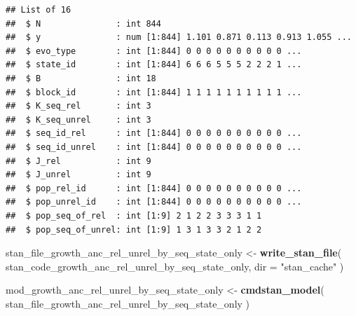 \documentclass[
]{article}
\newenvironment{Shaded}{\begin{snugshade}}{\end{snugshade}}
\newcommand{\AttributeTok}[1]{\textcolor[rgb]{0.13,0.29,0.53}{#1}}
\newcommand{\DecValTok}[1]{\textcolor[rgb]{0.00,0.00,0.81}{#1}}
\newcommand{\FunctionTok}[1]{\textcolor[rgb]{0.13,0.29,0.53}{\textbf{#1}}}
\newcommand{\NormalTok}[1]{#1}
\newcommand{\OtherTok}[1]{\textcolor[rgb]{0.56,0.35,0.01}{#1}}
\newcommand{\SpecialCharTok}[1]{\textcolor[rgb]{0.81,0.36,0.00}{\textbf{#1}}}
\newcommand{\StringTok}[1]{\textcolor[rgb]{0.31,0.60,0.02}{#1}}
\begin{document}
\begin{verbatim}
## List of 16
##  $ N               : int 844
##  $ y               : num [1:844] 1.101 0.871 0.113 0.913 1.055 ...
##  $ evo_type        : int [1:844] 0 0 0 0 0 0 0 0 0 0 ...
##  $ state_id        : int [1:844] 6 6 6 5 5 5 2 2 2 1 ...
##  $ B               : int 18
##  $ block_id        : int [1:844] 1 1 1 1 1 1 1 1 1 1 ...
##  $ K_seq_rel       : int 3
##  $ K_seq_unrel     : int 3
##  $ seq_id_rel      : int [1:844] 0 0 0 0 0 0 0 0 0 0 ...
##  $ seq_id_unrel    : int [1:844] 0 0 0 0 0 0 0 0 0 0 ...
##  $ J_rel           : int 9
##  $ J_unrel         : int 9
##  $ pop_rel_id      : int [1:844] 0 0 0 0 0 0 0 0 0 0 ...
##  $ pop_unrel_id    : int [1:844] 0 0 0 0 0 0 0 0 0 0 ...
##  $ pop_seq_of_rel  : int [1:9] 2 1 2 2 3 3 3 1 1
##  $ pop_seq_of_unrel: int [1:9] 1 3 1 3 3 2 1 2 2
\end{verbatim}

\begin{Shaded}
\begin{Highlighting}[]
\NormalTok{stan\_file\_growth\_anc\_rel\_unrel\_by\_seq\_state\_only }\OtherTok{\textless{}{-}} \FunctionTok{write\_stan\_file}\NormalTok{(}
\NormalTok{  stan\_code\_growth\_anc\_rel\_unrel\_by\_seq\_state\_only,}
  \AttributeTok{dir =} \StringTok{"stan\_cache"}
\NormalTok{)}

\NormalTok{mod\_growth\_anc\_rel\_unrel\_by\_seq\_state\_only }\OtherTok{\textless{}{-}} \FunctionTok{cmdstan\_model}\NormalTok{(}
\NormalTok{  stan\_file\_growth\_anc\_rel\_unrel\_by\_seq\_state\_only}
\NormalTok{)}
\end{Highlighting}
\end{Shaded}

\begin{Shaded}
\end{Shaded}
\end{document}
